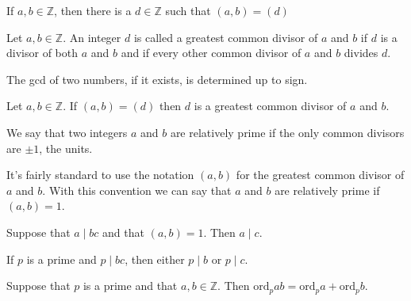 \documentclass{mynotes}
\begin{document}
\begin{lemma}
If $a,b\in \mathbb{Z}$, then there is a $d\in \mathbb{Z}$ such that $(a, b)=(d)$
\end{lemma}
\begin{definition}
Let $a,b\in\mathbb{Z}$. An integer $d$ is called a greatest common divisor of $a$ and $b$ if $d$ is a divisor of both $a$ and $b$ and if every other common divisor of $a$ and $b$ divides $d$.
\end{definition}
\begin{remark}
The gcd of two numbers, if it exists, is determined up to sign.
\end{remark}
\begin{lemma}
Let $a,b\in\mathbb{Z}$. If $(a,b) = (d)$ then $d$ is a greatest common divisor of $a$ and $b$.
\end{lemma}
\begin{definition}
We say that two integers $a$ and $b$ are relatively prime if the only common divisors are $\pm1$, the units.
\end{definition}
It's fairly standard to use the notation $(a, b)$ for the greatest common divisor of $a$ and $b$. With this convention we can say that $a$ and $b$ are relatively prime if $(a,b)=1$.
\begin{proposition}
Suppose that $a\mid bc$ and that $(a,b)=1$. Then $a\mid c$.
\end{proposition}
\begin{corollary}
If $p$ is a prime and $p\mid bc$, then either $p\mid b$ or $p\mid c$.
\end{corollary}
\begin{corollary}
Suppose that $p$ is a prime and that $a,b\in\mathbb{Z}$. Then $\mbox{ord}_pab=\mbox{ord}_pa+\mbox{ord}_pb.$
\end{corollary}
\end{document}
